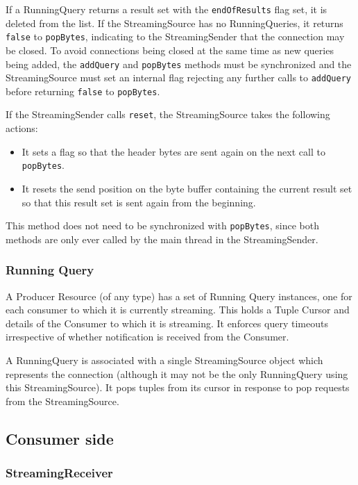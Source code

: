 If a RunningQuery returns a result set with the \texttt{endOfResults} flag set,
it is deleted from the list. If the StreamingSource has no RunningQueries,
it returns \texttt{false} to \texttt{popBytes}, indicating to the StreamingSender 
that the connection may be closed. To avoid connections being closed at the
same time as new queries being added, the \texttt{addQuery} and \texttt{popBytes}
methods must be synchronized and the StreamingSource must set an internal flag 
rejecting any further calls to \texttt{addQuery} before returning 
\texttt{false} to \texttt{popBytes}.
 
If the StreamingSender calls \texttt{reset}, the StreamingSource takes the following 
actions:

\begin{itemize}
\item It sets a flag so that the header bytes are sent again on the next call to
      \texttt{popBytes}.
\item It resets the send position on the byte buffer containing the current result set
      so that this result set is sent again from the beginning.
\end{itemize}

This method does not need to be synchronized with \texttt{popBytes}, since both methods
are only ever called by the main thread in the StreamingSender.

\subsubsection*{Running Query}



A Producer Resource (of any type) has a set of Running Query
instances, one for each consumer to which it is currently
streaming. This holds a Tuple Cursor and details of the Consumer
to which it is streaming. It enforces query timeouts irrespective
of whether notification is received from the Consumer. 

A RunningQuery is associated with a single StreamingSource object which
represents the connection (although it may not be the only RunningQuery
using this StreamingSource). It pops tuples from its cursor in response 
to pop requests from the StreamingSource.


\subsection{Consumer side}

\subsubsection*{StreamingReceiver}




